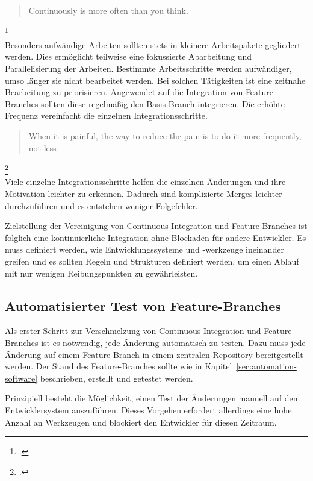 \blockquote {Continuously is more often than you think.}\footcite[vgl.][Kap. Continuous Integration]{humble2010}\\

Besonders aufwändige Arbeiten sollten stets in kleinere Arbeitspakete gegliedert werden. Dies ermöglicht teilweise eine fokussierte Abarbeitung und Parallelisierung der Arbeiten. Bestimmte Arbeitsschritte werden aufwändiger, umso länger sie nicht bearbeitet werden. Bei solchen Tätigkeiten ist eine zeitnahe Bearbeitung zu priorisieren.
Angewendet auf die Integration von Feature-Branches sollten diese regelmäßig den Basis-Branch integrieren. Die erhöhte Frequenz vereinfacht die einzelnen Integrationsschritte.\\

\blockquote {When it is painful, the way to reduce the pain is to do it more frequently, not less}\footcite[vgl.][S.24]{humble2010}\\

Viele einzelne Integrationsschritte helfen die einzelnen Änderungen und ihre Motivation leichter zu erkennen. Dadurch sind komplizierte Merges leichter durchzuführen und es entstehen weniger Folgefehler.
 
Zielstellung der Vereinigung von Continuous-Integration und Feature-Branches ist folglich eine kontinuierliche Integration ohne Blockaden für andere Entwickler. Es muss definiert werden, wie Entwicklungssysteme und -werkzeuge ineinander greifen und es sollten Regeln und Strukturen definiert werden, um einen Ablauf mit nur wenigen Reibungspunkten zu gewährleisten.

\subsection{Automatisierter Test von Feature-Branches}

Als erster Schritt zur Verschmelzung von Continuous-Integration und Feature-Branches ist es notwendig, jede Änderung automatisch zu testen. Dazu muss jede Änderung auf einem Feature-Branch in einem zentralen Repository bereitgestellt werden. Der Stand des Feature-Branches sollte wie in Kapitel~\ref{sec:automation-software}  beschrieben, erstellt und getestet werden.

Prinzipiell besteht die Möglichkeit, einen Test der Änderungen manuell auf dem Entwicklersystem auszuführen. Dieses Vorgehen erfordert allerdings eine hohe Anzahl an Werkzeugen und blockiert den Entwickler für diesen Zeitraum.

